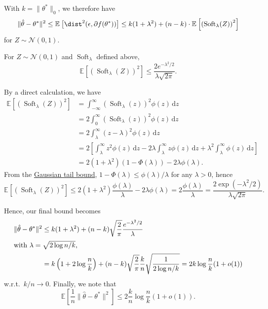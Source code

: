 With \(k = \lVert \theta ^{\ast} \rVert _0\), we therefore have
\[
	\lVert \hat{\theta} - \theta ^{\ast}  \rVert ^2
	\leq \mathbb{E}_{}\left[\dist^2(\epsilon , \partial f(\theta ^{\ast} )) \right]
	\leq k (1 + \lambda ^2) + (n - k) \cdot \mathbb{E}_{}\left[\left( \operatorname{Soft}_\lambda (Z)  \right) ^2 \right]
\]
for \(Z \sim \mathcal{N} (0, 1)\).

\begin{claim}
	For \(Z \sim \mathcal{N} (0, 1)\) and \(\operatorname{Soft}_\lambda \) defined above,
	\[
		\mathbb{E}_{}\left[ \left( \operatorname{Soft}_\lambda (Z) \right) ^2 \right]
		\leq \frac{2 e^{-\lambda ^2 / 2}}{ \lambda \sqrt{2\pi } }.
	\]
\end{claim}
\begin{explanation}
	By a direct calculation, we have
	\[
		\begin{split}
			\mathbb{E}_{}\left[ (\operatorname{Soft}_\lambda (Z) ) ^2 \right]
			 & = \int_{-\infty}^{\infty} ( \operatorname{Soft}_\lambda (z) ) ^2 \phi (z) \,\mathrm{d}z                                                                                                          \\
			 & = 2 \int_{0}^{\infty} ( \operatorname{Soft}_\lambda (z) ) ^2 \phi (z) \,\mathrm{d}z                                                                                                              \\
			 & = 2 \int_{\lambda}^{\infty} (z - \lambda )^2 \phi (z) \,\mathrm{d}z                                                                                                                              \\
			 & = 2 \left[ \int_{\lambda }^{\infty} z^2 \phi (z) \,\mathrm{d}z - 2\lambda \int_{\lambda }^{\infty} z \phi (z) \,\mathrm{d}z + \lambda ^2 \int_{\lambda }^{\infty} \phi (z) \,\mathrm{d}z \right] \\
			 & = 2 (1 + \lambda ^2) (1 - \Phi (\lambda )) - 2 \lambda \phi (\lambda ).
		\end{split}
	\]
	From the \hyperref[lma:Gaussian-tail-bound]{Gaussian tail bound}, \(1 - \Phi (\lambda ) \leq \phi (\lambda ) / \lambda \) for any \(\lambda > 0\), hence
	\[
		\mathbb{E}_{}\left[(\operatorname{Soft}_\lambda (Z) ) ^2 \right]
		\leq 2 (1 + \lambda ^2) \frac{\phi (\lambda )}{\lambda } - 2 \lambda \phi (\lambda )
		= 2 \frac{\phi (\lambda )}{\lambda }
		= \frac{2 \exp (-\lambda ^2 / 2)}{\lambda \sqrt{2\pi } }.
	\]
\end{explanation}

Hence, our final bound becomes
\begin{align*}
	\lVert \hat{\theta} - \theta ^{\ast} \rVert ^2
	 & \leq k(1 + \lambda ^2) + (n-k) \sqrt{\frac{2}{\pi }} \frac{e^{-\lambda ^2 / 2}}{\lambda }                         \\
	\shortintertext{with \(\lambda = \sqrt{2 \log n / k} \),}
	 & = k \left( 1 + 2 \log \frac{n}{k} \right) + (n-k) \sqrt{\frac{2}{\pi }} \frac{k}{n} \sqrt{\frac{1}{2 \log n / k}}
	= 2 k \log \frac{n}{k} (1 + o(1))
\end{align*}
w.r.t.\ \(k / n \to 0\). Finally, we note that
\[
	\mathbb{E}_{}\left[\frac{1}{n} \lVert \hat{\theta} - \theta ^{\ast} \rVert ^2 \right]
	\leq 2 \frac{k}{n} \log \frac{n}{k} (1 + o(1)).
\]

